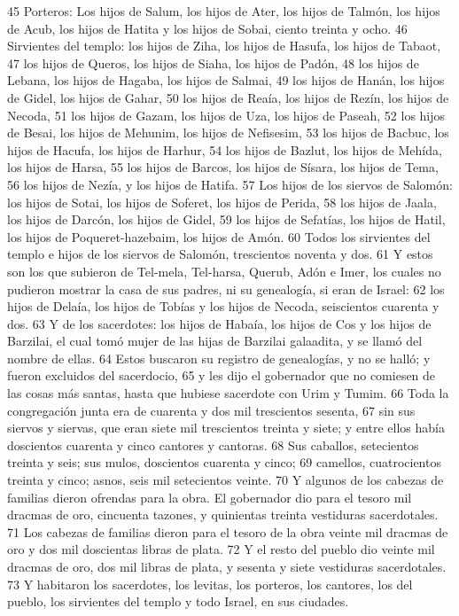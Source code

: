 45 Porteros: Los hijos de Salum, los hijos de Ater, los hijos de Talmón, los hijos de Acub, los hijos de Hatita y los hijos de Sobai, ciento treinta y ocho.
46 Sirvientes del templo: los hijos de Ziha, los hijos de Hasufa, los hijos de Tabaot,
47 los hijos de Queros, los hijos de Siaha, los hijos de Padón,
48 los hijos de Lebana, los hijos de Hagaba, los hijos de Salmai,
49 los hijos de Hanán, los hijos de Gidel, los hijos de Gahar,
50 los hijos de Reaía, los hijos de Rezín, los hijos de Necoda,
51 los hijos de Gazam, los hijos de Uza, los hijos de Paseah,
52 los hijos de Besai, los hijos de Mehunim, los hijos de Nefisesim,
53 los hijos de Bacbuc, los hijos de Hacufa, los hijos de Harhur,
54 los hijos de Bazlut, los hijos de Mehída, los hijos de Harsa,
55 los hijos de Barcos, los hijos de Sísara, los hijos de Tema,
56 los hijos de Nezía, y los hijos de Hatifa.
57 Los hijos de los siervos de Salomón: los hijos de Sotai, los hijos de Soferet, los hijos de Perida,
58 los hijos de Jaala, los hijos de Darcón, los hijos de Gidel,
59 los hijos de Sefatías, los hijos de Hatil, los hijos de Poqueret-hazebaim, los hijos de Amón.
60 Todos los sirvientes del templo e hijos de los siervos de Salomón, trescientos noventa y dos.
61 Y estos son los que subieron de Tel-mela, Tel-harsa, Querub, Adón e Imer, los cuales no pudieron mostrar la casa de sus padres, ni su genealogía, si eran de Israel:
62 los hijos de Delaía, los hijos de Tobías y los hijos de Necoda, seiscientos cuarenta y dos.
63 Y de los sacerdotes: los hijos de Habaía, los hijos de Cos y los hijos de Barzilai, el cual tomó mujer de las hijas de Barzilai galaadita, y se llamó del nombre de ellas.
64 Estos buscaron su registro de genealogías, y no se halló; y fueron excluidos del sacerdocio,
65 y les dijo el gobernador que no comiesen de las cosas más santas, hasta que hubiese sacerdote con Urim y Tumim. 
66 Toda la congregación junta era de cuarenta y dos mil trescientos sesenta,
67 sin sus siervos y siervas, que eran siete mil trescientos treinta y siete; y entre ellos había doscientos cuarenta y cinco cantores y cantoras.
68 Sus caballos, setecientos treinta y seis; sus mulos, doscientos cuarenta y cinco;
69 camellos, cuatrocientos treinta y cinco; asnos, seis mil setecientos veinte.
70 Y algunos de los cabezas de familias dieron ofrendas para la obra. El gobernador dio para el tesoro mil dracmas de oro, cincuenta tazones, y quinientas treinta vestiduras sacerdotales.
71 Los cabezas de familias dieron para el tesoro de la obra veinte mil dracmas de oro y dos mil doscientas libras de plata.
72 Y el resto del pueblo dio veinte mil dracmas de oro, dos mil libras de plata, y sesenta y siete vestiduras sacerdotales.
73 Y habitaron los sacerdotes, los levitas, los porteros, los cantores, los del pueblo, los sirvientes del templo y todo Israel, en sus ciudades. 

